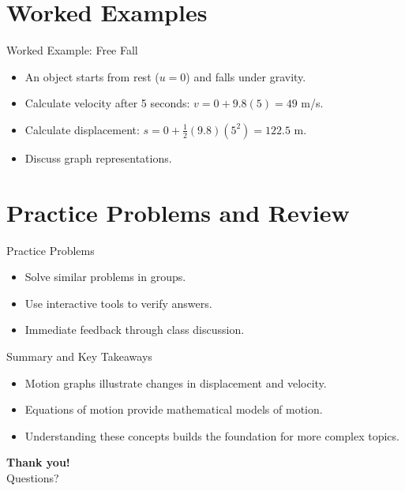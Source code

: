\documentclass[xcolor=svgnames]{beamer}
\begin{document}
\section{Worked Examples}
\begin{frame}{Worked Example: Free Fall}
    \begin{itemize}
        \item An object starts from rest ($u=0$) and falls under gravity.
        \item Calculate velocity after 5 seconds: $v = 0 + 9.8(5) = 49$ m/s.
        \item Calculate displacement: $s = 0 + \frac{1}{2}(9.8)(5^2) = 122.5$ m.
        \item Discuss graph representations.
    \end{itemize}
\end{frame}

\section{Practice Problems and Review}
\begin{frame}{Practice Problems}
    \begin{itemize}
        \item Solve similar problems in groups.
        \item Use interactive tools to verify answers.
        \item Immediate feedback through class discussion.
    \end{itemize}
\end{frame}

\begin{frame}{Summary and Key Takeaways}
    \begin{itemize}
        \item Motion graphs illustrate changes in displacement and velocity.
        \item Equations of motion provide mathematical models of motion.
        \item Understanding these concepts builds the foundation for more complex topics.
    \end{itemize}
\end{frame}

\begin{frame}
    \centering
    \textbf{Thank you!}\\
    Questions?
\end{frame}
\end{document}
